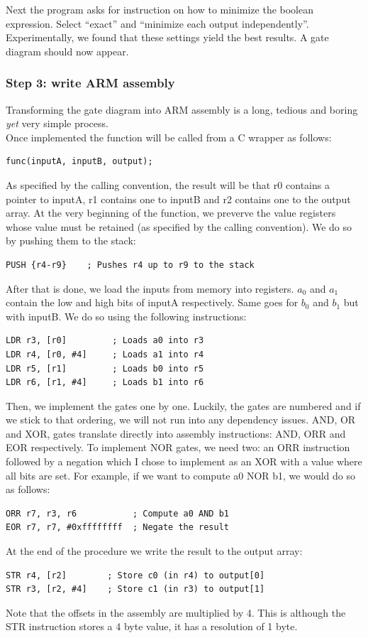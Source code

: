 \documentclass{report}
\begin{document}
Next the program asks for instruction on how to minimize the boolean expression. Select ``exact'' and ``minimize each output independently''. Experimentally, we found that these settings yield the best results. A gate diagram should now appear.

\subsubsection*{Step 3: write ARM assembly}
Transforming the gate diagram into ARM assembly is a long, tedious and boring \textit{yet} very simple process.\\
Once implemented the function will be called from a C wrapper as follows:
\begin{verbatim}
func(inputA, inputB, output);
\end{verbatim}
As specified by the calling convention, the result will be that r0 contains a pointer to inputA, r1 contains one to inputB and r2 contains one to the output array.
At the very beginning of the function, we preverve the value registers whose value must be retained (as specified by the calling convention). We do so by pushing them to the stack:
\begin{verbatim}
PUSH {r4-r9}    ; Pushes r4 up to r9 to the stack
\end{verbatim}
After that is done, we load the inputs from memory into registers. $a_0$ and $a_1$ contain the low and high bits of inputA respectively. Same goes for $b_0$ and $b_1$ but with inputB. We do so using the following instructions:
\begin{verbatim}
LDR r3, [r0]         ; Loads a0 into r3
LDR r4, [r0, #4]     ; Loads a1 into r4 
LDR r5, [r1]         ; Loads b0 into r5
LDR r6, [r1, #4]     ; Loads b1 into r6
\end{verbatim}
Then, we implement the gates one by one. Luckily, the gates are numbered and if we stick to that ordering, we will not run into any dependency issues. 
AND, OR and XOR, gates translate directly into assembly instructions: AND, ORR and EOR respectively. To implement NOR gates, we need two: an ORR instruction followed by a negation which I chose to implement as an XOR with a value where all bits are set. For example, if we want to compute a0 NOR b1, we would do so as follows:
\begin{verbatim}
ORR r7, r3, r6           ; Compute a0 AND b1
EOR r7, r7, #0xffffffff  ; Negate the result
\end{verbatim}
At the end of the procedure we write the result to the output array:
\begin{verbatim}
STR r4, [r2]        ; Store c0 (in r4) to output[0]
STR r3, [r2, #4]    ; Store c1 (in r3) to output[1]
\end{verbatim}
Note that the offsets in the assembly are multiplied by 4. This is although the STR instruction stores a 4 byte value, it has a resolution of 1 byte.
\end{document}
